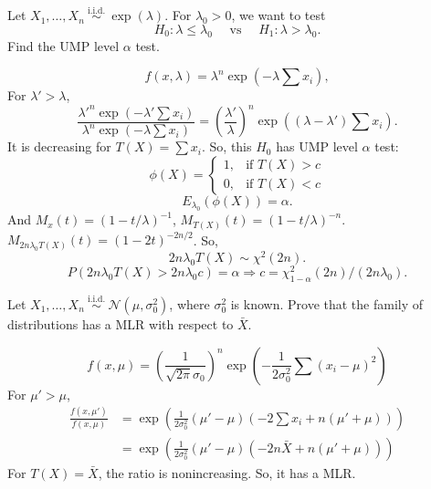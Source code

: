 \begin{ex}
    Let \(X_{1}, \ldots, X_{n} \stackrel{\text { i.i.d. }}{\sim} \exp (\lambda)\). For \(\lambda_{0}>0\), we want to test
    \[
        H_{0}: \lambda \leq \lambda_{0} \quad \text { vs } \quad H_{1}: \lambda>\lambda_{0} .
    \]
    Find the UMP level \(\alpha\) test. 
\end{ex}

\begin{solution}
    \[
        f(x, \lambda)=\lambda^n\exp\left(-\lambda\sum x_i\right), 
    \]
    For $\lambda'>\lambda$, 
    \[
        \frac{\lambda'^n\exp\left(-\lambda'\sum x_i\right)}{\lambda^n\exp\left(-\lambda\sum x_i\right)}=\left(\frac{\lambda'}{\lambda}\right)^n\exp\left((\lambda-\lambda')\sum x_i\right). 
    \]
    It is decreasing for $T(X)=\sum x_i$. So, this $H_0$ has UMP level $\alpha$ test: 
    \[
        \phi(X)=\left\{\begin{matrix}
            1, & \text{if } T(X)>c\\
            0, & \text{if } T(X)<c
        \end{matrix}\right.
    \]
    \[
        E_{\lambda_0}(\phi(X))=\alpha. 
    \]
    And $M_x(t)=(1-t/\lambda)^{-1}$, $M_{T(X)}(t)=(1-t/\lambda)^{-n}$. $M_{2n\lambda_0T(X)}(t)=(1-2t)^{-2n/2}$. So, 
    \[
        2n\lambda_0T(X)\sim \chi^2(2n). 
    \]
    \[
        P(2n\lambda_0T(X)>2n\lambda_0c)=\alpha\Rightarrow c=\chi^2_{1-\alpha}(2n)/(2n\lambda_0). 
    \]
\end{solution}


\begin{ex}
    Let \(X_{1}, \ldots, X_{n} \stackrel{\text { i.i.d. }}{\sim} \mathcal{N}\left(\mu, \sigma_{0}^{2}\right)\), where \(\sigma_{0}^{2}\) is known. Prove that the family of distributions has a MLR with respect to \(\bar{X}\). 
\end{ex}

\begin{solution}
    \[
        f(x, \mu)=\left(\frac{1}{\sqrt{2\pi}\sigma_0}\right)^n\exp\left(-\frac{1}{2\sigma_{0}^{2}}\sum\left(x_i-\mu\right)^2\right)
    \]
    For $\mu'>\mu$, 
    \[\begin{aligned}
        \frac{f(x,\mu')}{f(x,\mu)}&=\exp\left(\frac{1}{2\sigma_0^2}(\mu'-\mu)\left(-2\sum x_i+n(\mu'+\mu)\right)\right)\\
        &=\exp\left(\frac{1}{2\sigma_0^2}(\mu'-\mu)\left(-2n\bar{X}+n(\mu'+\mu)\right)\right)
    \end{aligned}
    \]
    For $T(X)=\bar{X}$, the ratio is nonincreasing. So, it has a MLR. 
\end{solution}


